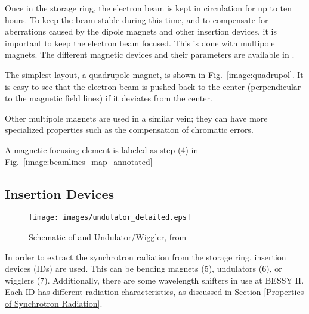 \documentclass[a4paper,10pt]{article}
\begin{document}
    Once in the storage ring, the electron beam is kept in circulation for
up to ten hours. To keep the beam stable during this time, and to compensate for
aberrations caused by the dipole magnets and other insertion devices, it is
important to keep the electron beam focused. This is done with multipole
magnets. The different magnetic devices and their parameters are available in
\citep{becker1995, budz2006}.

    The simplest layout, a quadrupole magnet, is shown in
Fig.~\ref{image:quadrupol}. It is easy to see that the electron beam is pushed
back to the center (perpendicular to the magnetic field lines) if it deviates
from the center.

    Other multipole magnets are used in a similar vein; they can have more
specialized properties such as the compensation of chromatic errors. 

    A magnetic focusing element is labeled as step (4) in
Fig.~\ref{image:beamlines_map_annotated}

    \subsection{Insertion Devices} \label{Insertion Devices}


\begin{figure}[htbp]
    \centering
    \texttt{[image: images/undulator\_detailed.eps]}
    \caption{Schematic of and Undulator/Wiggler, from \citep{attwoodlecture}}
  \label{image:undulator_detailed}
\end{figure}


    In order to extract the synchrotron radiation from the storage ring,
insertion devices (IDs) are used. This can be bending magnets (5), undulators
(6), or wigglers (7). Additionally, there are some wavelength shifters in use at
BESSY II. Each ID has different radiation characteristics, as discussed in
Section \ref{Properties of Synchrotron Radiation}.
\end{document}

